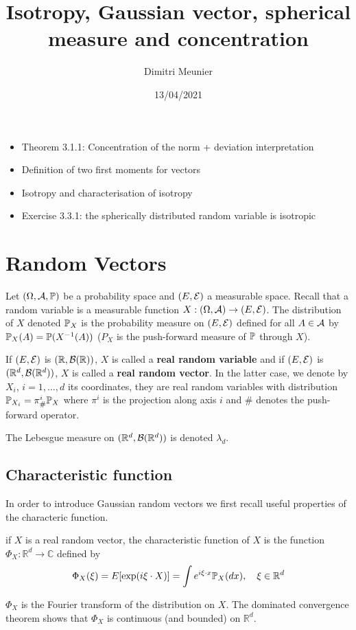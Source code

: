 \documentclass{article}
\title{Isotropy, Gaussian vector, spherical measure and concentration}
\author{Dimitri Meunier}
\date{13/04/2021}
\begin{document}
\maketitle

\begin{itemize}
\item Theorem 3.1.1: Concentration of the norm + deviation interpretation
\item Definition of two first moments for vectors
\item Isotropy and characterisation of isotropy
\item Exercise 3.3.1: the spherically distributed random variable is isotropic
\end{itemize}

\section{Random Vectors}

Let $(\Omega,\cA,\P)$ be a probability space and $(E,\cE)$ a measurable space.
Recall that a random variable is a measurable function $X:(\Omega,\cA) \to
(E,\cE)$. The distribution of $X$ denoted $\P_X$ is the probability measure on
$(E,\cE)$ defined for all $A \in \cA$ by $\P_X(A) = \P(X^{-1}(A))$ ($P_X$ is the
push-forward measure of $\P$ through $X$).

If $(E,\cE)$ is $(\R,\cB(\R))$, $X$ is called a \textbf{real random
variable} and if $(E,\cE)$ is $(\Rd,\cB(\Rd))$, $X$ is called a
\textbf{real random vector}. In the latter case, we denote by $X_i$,
$i=1,\ldots,d$ its coordinates, they are real random variables with distribution
$\P_{X_i} = \pi^i_{\#}\P_X$ where $\pi^i$ is the projection along axis $i$ and
$\#$ denotes the push-forward operator.

The Lebesgue measure on $(\Rd,\cB(\Rd))$ is denoted $\lambda_d$.

\subsection{Characteristic function}

In order to introduce Gaussian random vectors we first recall useful properties
of the characteric function.

\begin{definition}
  if $X$ is a real random vector, the characteristic function of $X$ is the function
  $\Phi_{X}: \mathbb{R}^{d} \longrightarrow \mathbb{C}$ defined by 
  $$
  \Phi_{X}(\xi)=E[\exp (i \xi \cdot X)] = \int e^{i \xi \cdot x} \P_{X}(d x), \quad \xi \in \mathbb{R}^{d}
  $$

  $\Phi_{X}$ is the Fourier transform of the distribution on $X$. The dominated
  convergence theorem shows that $\Phi_{X}$ is continuous (and bounded) on $\mathbb{R}^{d}$.
\end{definition}
\end{document}
